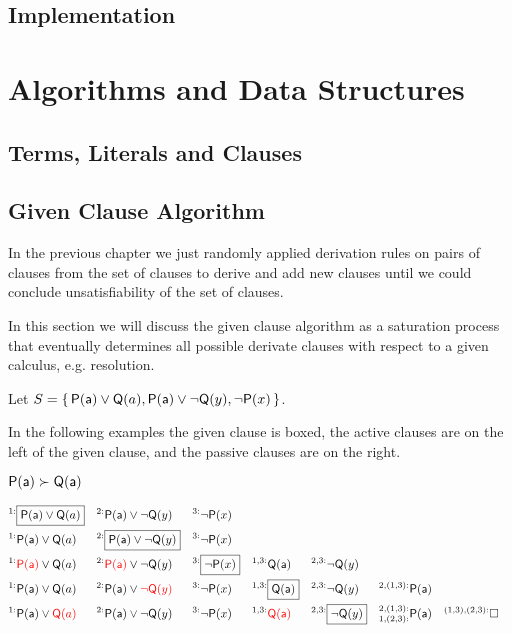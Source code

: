 
\section{Implementation}

\chapter{Algorithms and Data Structures}

\section{Terms, Literals and Clauses}




\section{Given Clause Algorithm}

In the previous chapter we just randomly applied derivation rules
on pairs of clauses from the set of clauses 
to derive and add new clauses 
until we could conclude unsatisfiability of the set of clauses.

In this section we will discuss the given clause algorithm 
as a saturation process that eventually determines all possible derivate clauses
with respect to a given calculus, e.g. resolution.


Let $S=\{\, {\mathsf P}({\mathsf a})\lor{\mathsf Q}(a), {\mathsf P}({\mathsf a})\lor\lnot{\mathsf Q}(y), \lnot{\mathsf P}(x) \,\}$.

In the following examples the given clause is boxed, 
the active clauses are on the left of the given clause, 
and the passive clauses are on the right.

\begin{example} ${\mathsf P}({\mathsf a})\succ{\mathsf Q}({\mathsf a})$
	
	\begin{align*}
	^{1:}&\boxed{\mP(\ma)\lor\mQ(a)} & ^{2:}&\mP(\ma)\lor\lnot\mQ(y) & ^{3:}&\lnot\mP(x) 
	\\
	^{1:}&\mP(\ma)\lor\mQ(a) & ^{2:}&\boxed{\mP(\ma)\lor\lnot\mQ(y)} & ^{3:}&\lnot\mP(x) 
	\\
	^{1:}&{\colLo\mP(\ma)}\lor\mQ(a) & ^{2:}&{\colLo\mP(\ma)}\lor\lnot\mQ(y) & ^{3:}&\boxed{\lnot\mP(x)} 
	& ^{1,3:}&\mQ(\ma) & ^{2,3:}&\lnot\mQ(y)
	\\
	^{1:}&\mP(\ma)\lor\mQ(a) & ^{2:}&\mP(\ma)\lor{\colLo\lnot\mQ(y)} & ^{3:}&\lnot\mP(x)
	& ^{1,3:}&\boxed{\mQ(\ma)} & ^{2,3:}&\lnot\mQ(y) & ^{2,(1,3):}&\mP(\ma)
	\\
	^{1:}&\mP(\ma)\lor{\colLo\mQ(a)} & ^{2:}&\mP(\ma)\lor\lnot\mQ(y) & ^{3:}&\lnot\mP(x)
	& ^{1,3:}&\colLo\mQ(\ma) & ^{2,3:}&\boxed{\lnot\mQ(y)} & ^{2,(1,3):}_{1,(2,3):}&\mP(\ma)
	& ^{(1,3),(2,3):}&\emptyclause
	\\
	\end{align*}
\end{example}


